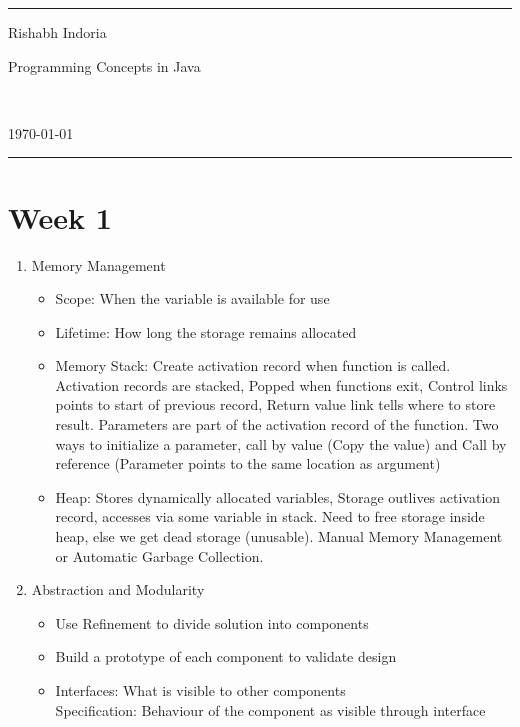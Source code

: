 \documentclass[a4paper]{article}
\begin{document}
\fancyhead[c]{}
\hrule \medskip
\begin{minipage}{0.295\textwidth}
\raggedright
Rishabh Indoria
\end{minipage}
\begin{minipage}{0.4\textwidth}
\centering
\LARGE
Programming Concepts in Java
\end{minipage}\
\begin{minipage}{0.295\textwidth}
\raggedleft
\today \hfill \\
\end{minipage}
\medskip \hrule
\bigskip

\section{Week 1}
\begin{enumerate}
    \item Memory Management
    \begin{itemize}
        \item Scope: When the variable is available for use
        \item Lifetime: How long the storage remains allocated
        \item Memory Stack: Create activation record when function is called. Activation records are stacked, Popped when functions exit, Control links points to start of previous record, Return value link tells where to store result. Parameters are part of the activation record of the function. Two ways to initialize a parameter, call by value (Copy the value) and Call by reference (Parameter points to the same location as argument)
        \item Heap: Stores dynamically allocated variables, Storage outlives activation record, accesses via some variable in stack. Need to free storage inside heap, else we get dead storage (unusable). Manual Memory Management or Automatic Garbage Collection.
    \end{itemize}
    \item Abstraction and Modularity
    \begin{itemize}
        \item Use Refinement to divide solution into components
        \item Build a prototype of each component to validate design
        \item Interfaces: What is visible to other components\\
        Specification: Behaviour of the component as visible through interface

\end{itemize}
\end{enumerate}
\end{document}
